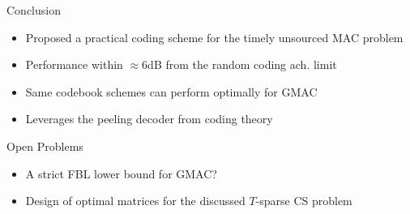 \begin{frame}{Conclusion}
\begin{itemize}  
  \item Proposed a practical coding scheme for the timely unsourced MAC problem
  \item Performance within $\approx 6$dB from the random coding ach. limit
  \item Same codebook schemes can perform optimally for GMAC
  \item Leverages the peeling decoder from coding theory  
\end{itemize}

\pause
Open Problems
\begin{itemize}
  \item A strict FBL lower bound for GMAC?
  \item Design of optimal matrices for the discussed $T$-sparse CS problem
\end{itemize}
\end{frame}




